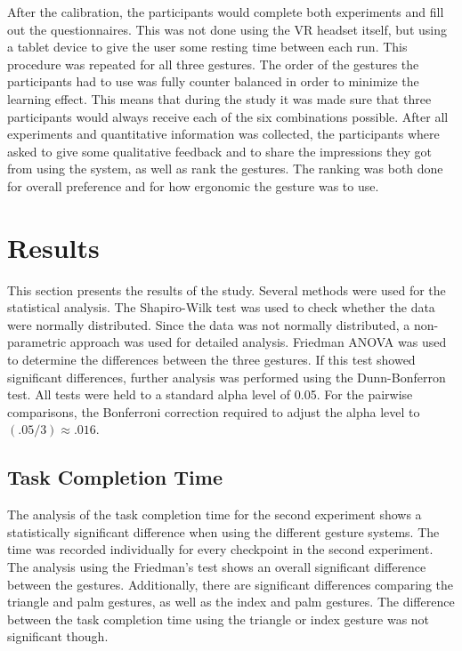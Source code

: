 After the calibration, the participants would complete both experiments and fill out the questionnaires. This was not done using the VR headset itself, but using a tablet device to give the user some resting time between each run. This procedure was repeated for all three gestures. 
The order of the gestures the participants had to use was fully counter balanced in order to minimize the learning effect. This means that during the study it was made sure that three participants would always receive each of the six combinations possible. 
After all experiments and quantitative information was collected, the participants where asked to give some qualitative feedback and to share the impressions they got from using the system, as well as rank the gestures. The ranking was both done for overall preference and for how ergonomic the gesture was to use.   


\section{Results}
This section presents the results of the study. Several methods were used for the statistical analysis. The Shapiro-Wilk test was used to check whether the data were normally distributed. Since the data was not normally distributed, a non-parametric approach was used for detailed analysis. Friedman ANOVA was used to determine the differences between the three gestures. If this test showed significant differences, further analysis was performed using the Dunn-Bonferron test. All tests were held to a standard alpha level of 0.05. For the
pairwise comparisons, the Bonferroni correction required to adjust the alpha level to $(.05/3) \approx .016$.

\subsection{Task Completion Time}
The analysis of the task completion time for the second experiment shows a statistically significant difference when using the different gesture systems. The time was recorded individually for every checkpoint in the second experiment. The analysis using the Friedman’s test shows an overall significant difference between the gestures. Additionally, there are significant differences comparing the triangle and palm gestures, as well as the index and palm gestures. The difference between the task completion time using the triangle or index gesture was not significant though.

